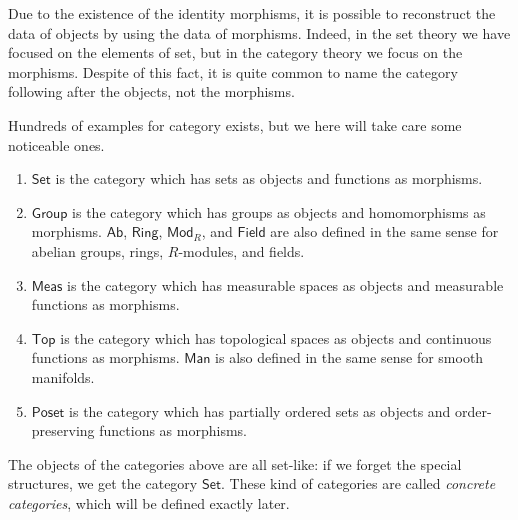 Due to the existence of the identity morphisms, it is possible to reconstruct the data of objects by using the data of morphisms. Indeed, in the set theory we have focused on the elements of set, but in the category theory we focus on the morphisms. Despite of this fact, it is quite common to name the category following after the objects, not the morphisms.


\begin{exmp} Hundreds of examples for category exists, but we here will take care some noticeable ones.
\begin{enumerate}
\item $\mathsf{Set}$ is the category which has sets as objects and functions as morphisms.
\item $\mathsf{Group}$ is the category which has groups as objects and homomorphisms as morphisms. $\mathsf{Ab}$, $\mathsf{Ring}$, $\mathsf{Mod}_R$, and $\mathsf{Field}$ are also defined in the same sense for abelian groups, rings, $R$-modules, and fields.
\item $\mathsf{Meas}$ is the category which has measurable spaces as objects and measurable functions as morphisms.
\item $\mathsf{Top}$ is the category which has topological spaces as objects and continuous functions as morphisms. $\mathsf{Man}$ is also defined in the same sense for smooth manifolds.
\item $\mathsf{Poset}$ is the category which has partially ordered sets as objects and order-preserving functions as morphisms.
\end{enumerate}
\end{exmp}

The objects of the categories above are all set-like: if we forget the special structures, we get the category $\mathsf{Set}$. These kind of categories are called \textit{concrete categories}, which will be defined exactly later.

